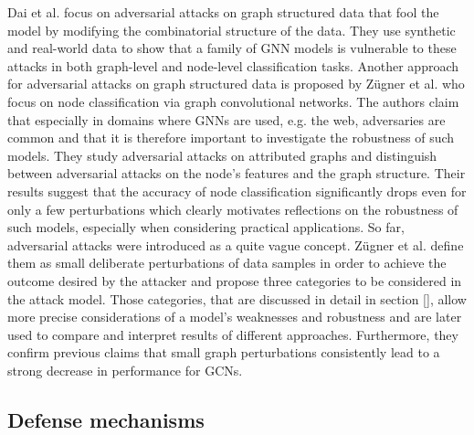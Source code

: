 \documentclass[a4paper,preprint]{sig-alternate}
\begin{document}
Dai et al. \cite{dai2018adversarial} focus on adversarial attacks on graph structured data that fool the model by modifying the
combinatorial structure of the data. They use synthetic and real-world data to show that a family of GNN models is vulnerable
to these attacks in both graph-level and node-level classification tasks.
Another approach for adversarial attacks on graph structured data is proposed by Zügner et al. \cite{Z_gner_2018} who focus on node classification
via graph convolutional networks.
The authors claim that especially in domains where GNNs are used, e.g. the web, adversaries are common and that it is therefore important
to investigate the robustness of such models. They study adversarial attacks on attributed graphs and distinguish between
adversarial attacks on the node's features and the graph structure. Their results suggest that the accuracy of node classification
significantly drops even for only a few perturbations which clearly motivates reflections on the robustness of such models, especially
when considering practical applications.
So far, adversarial attacks were introduced as a quite vague concept. Zügner et al. \cite{zuegner2019adversarial}
define them as small deliberate perturbations of data samples in order to achieve the outcome desired by the attacker
and propose three categories to be considered in the attack model. Those categories, that are discussed in detail in section \ref{},
allow more precise considerations of a model's weaknesses and robustness and are later used to compare and interpret results of 
different approaches. Furthermore, they confirm previous claims that small graph perturbations consistently lead to a strong decrease 
in performance for GCNs.

\vfill
\pagebreak

\subsection{Defense mechanisms}
\label{sec:rev2}
\end{document}
